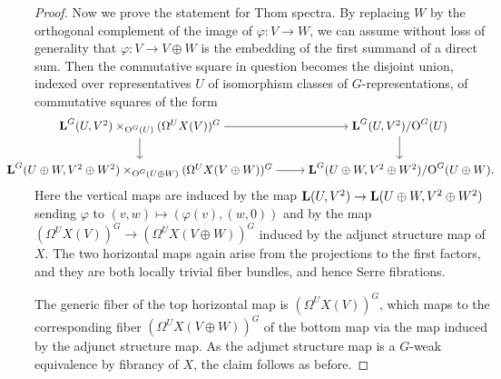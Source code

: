 \documentclass[reqno]{memo-l}
\theoremstyle{mythm}
\theoremstyle{definition}
\numberwithin{equation}{section}
\renewcommand{\phi}{\varphi}
\newcommand{\cat}[1]{\textbf{\textup{#1}}}
\renewcommand{\O}{{\textup{O}}}
\begin{document}
\begin{proof}
Now we prove the statement for Thom spectra.  By replacing $W$ by the orthogonal complement of the image of $\varphi\colon V\to W$,
  we can assume without loss of generality that $\varphi\colon V\to V\oplus W$ is
  the embedding of the first summand of a direct sum.
  Then the commutative square in question becomes the disjoint union, indexed over 
  representatives $U$ of isomorphism classes of $G$-representations, of commutative squares of the form 
  \[\hskip-23.56pt\hfuzz=23.6pt
  \begin{tikzcd}[cramped]
  \cat L^G(U,V^2)\times_{\O^G(U)} (\Omega^UX(V))^G\arrow[d]\arrow[r] & 
  \cat L^G(U,V^2)/\O^G(U)\arrow[d]\\
  \cat L^G(U\oplus W,V^2\oplus W^2)\times_{\O^G(U\oplus W)}(\Omega^UX(V\oplus W))^G\arrow[r]& \cat L^G(U\oplus W, V^2\oplus W^2)/\O^G(U\oplus W)\rlap.
  \end{tikzcd}
\]
  Here the vertical maps are induced by the map $\cat{L}(U,V^2)\to\cat{L}(U\oplus W,V^2\oplus W^2)$ sending $\phi$ to $(v,w)\mapsto (\phi(v),(w,0))$ and by the map $(\Omega^UX(V))^G\to(\Omega^UX(V\oplus W))^G$ induced by the adjunct structure map of $X$. The two horizontal maps again arise from the projections to the first factors, and they are both locally trivial 
  fiber bundles, and hence Serre fibrations. 

   The generic fiber of the top horizontal map is $(\Omega^UX(V))^G$, which maps to the corresponding fiber $(\Omega^UX(V\oplus W))^G$ of the bottom map via the map induced by the adjunct structure map. As the adjunct structure map is a $G$-weak equivalence by fibrancy of $X$, the claim follows as before.
\end{proof}
\end{document}
